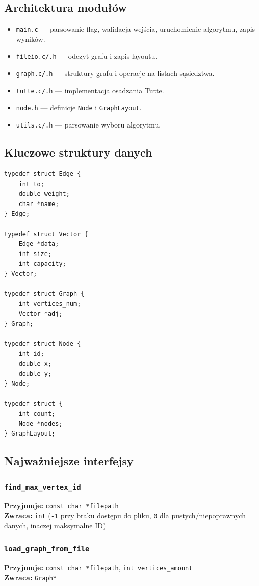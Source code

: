 \documentclass[12pt]{article}
\begin{document}
\subsection{Architektura modułów}
\begin{itemize}
	\item \texttt{main.c} — parsowanie flag, walidacja wejścia, uruchomienie algorytmu, zapis wyników.
	\item \texttt{fileio.c/.h} — odczyt grafu i zapis layoutu.
	\item \texttt{graph.c/.h} — struktury grafu i operacje na listach sąsiedztwa.
	\item \texttt{tutte.c/.h} — implementacja osadzania Tutte.
	\item \texttt{node.h} — definicje \texttt{Node} i \texttt{GraphLayout}.
	\item \texttt{utils.c/.h} — parsowanie wyboru algorytmu.
\end{itemize}

\subsection{Kluczowe struktury danych}
\begin{lstlisting}
typedef struct Edge {
    int to;
    double weight;
    char *name;
} Edge;

typedef struct Vector {
    Edge *data;
    int size;
    int capacity;
} Vector;

typedef struct Graph {
    int vertices_num;
    Vector *adj;
} Graph;

typedef struct Node {
    int id;
    double x;
    double y;
} Node;

typedef struct {
    int count;
    Node *nodes;
} GraphLayout;
\end{lstlisting}

\subsection{Najważniejsze interfejsy}
\subsubsection{\texttt{find\_max\_vertex\_id}}
\textbf{Przyjmuje:} \texttt{const char *filepath}\\
\textbf{Zwraca:} \texttt{int} (\texttt{-1} przy braku dostępu do pliku, \texttt{0} dla pustych/niepoprawnych danych, inaczej maksymalne ID)

\subsubsection{\texttt{load\_graph\_from\_file}}
\textbf{Przyjmuje:} \texttt{const char *filepath}, \texttt{int vertices\_amount}\\
\textbf{Zwraca:} \texttt{Graph*}
\end{document}
